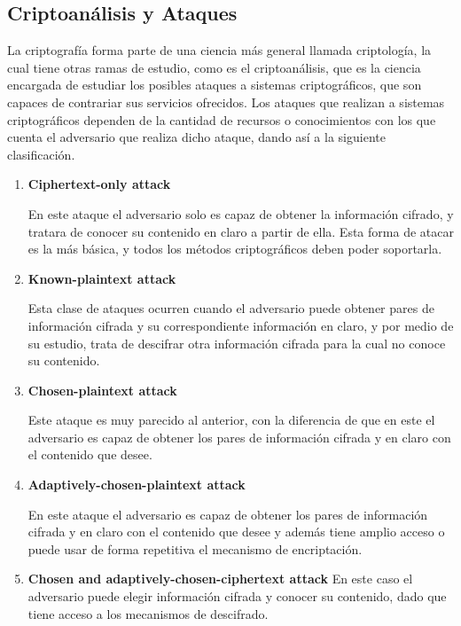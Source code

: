   \subsection{Criptoanálisis y Ataques}
  
    La criptografía forma parte de una ciencia más general llamada 
    criptología, la cual tiene otras ramas de estudio, como es el 
    criptoanálisis, que es la ciencia encargada de estudiar los posibles 
    ataques a sistemas criptográficos, que son capaces de contrariar sus 
    servicios ofrecidos. 
    Los ataques que realizan a sistemas criptográficos dependen de la cantidad 
    de recursos o conocimientos con los que cuenta el adversario que realiza 
    dicho ataque, dando así a la siguiente clasificación.

    \begin{enumerate}
      
      \item \textbf{Ciphertext-only attack}
      
        En este ataque el adversario solo es capaz de obtener la información 
        cifrado, y tratara de conocer su contenido en claro a partir de ella.
        Esta forma de atacar es la más básica, y todos los métodos 
        criptográficos deben poder soportarla.
      
      \item \textbf{Known-plaintext attack}
      
        Esta clase de ataques ocurren cuando el adversario puede obtener pares 
        de información cifrada y su correspondiente información en claro, y 
        por medio de su estudio, trata de descifrar otra información cifrada 
        para la cual no conoce su contenido.

      \item \textbf{Chosen-plaintext attack}
      
        Este ataque es muy parecido al anterior, con la diferencia de que en 
        este el adversario es capaz de obtener los pares de información 
        cifrada y en claro con el contenido que desee.

      \item \textbf{Adaptively-chosen-plaintext attack}
      
        En este ataque el adversario es capaz de obtener los pares de 
        información cifrada y en claro con el contenido que desee y además 
        tiene amplio acceso o puede usar de forma repetitiva el mecanismo de 
        encriptación.
      
      \item \textbf{Chosen and adaptively-chosen-ciphertext attack}
        En este caso el adversario puede elegir información cifrada y conocer 
        su contenido, dado que tiene acceso a los mecanismos de descifrado.
    
    \end{enumerate}
  
